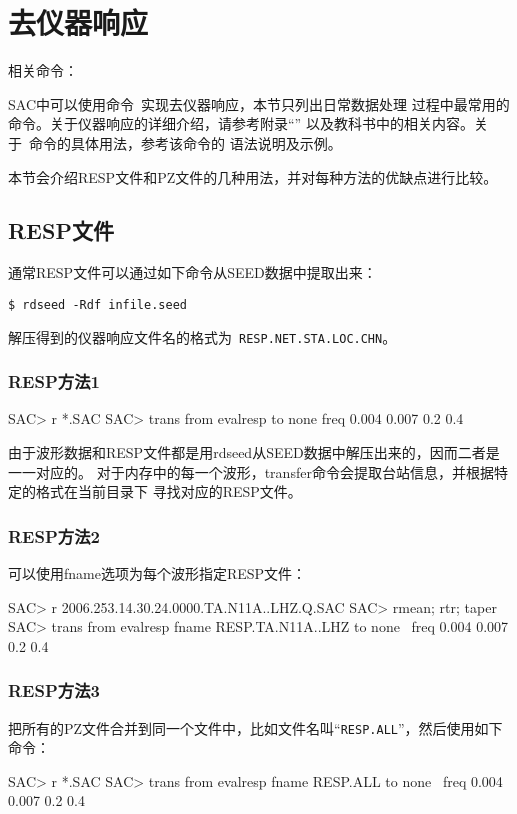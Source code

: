 \section{去仪器响应}
\label{sec:instrument-response}
相关命令：

SAC中可以使用命令~实现去仪器响应，本节只列出日常数据处理
过程中最常用的命令。关于仪器响应的详细介绍，请参考附录``''
以及教科书中的相关内容。关于~命令的具体用法，参考该命令的
语法说明及示例。

本节会介绍RESP文件和PZ文件的几种用法，并对每种方法的优缺点进行比较。
\subsection{RESP文件}
通常RESP文件可以通过如下命令从SEED数据中提取出来：
\begin{verbatim}
$ rdseed -Rdf infile.seed
\end{verbatim}
解压得到的仪器响应文件名的格式为~\verb+RESP.NET.STA.LOC.CHN+。

\subsubsection{RESP方法1}
\begin{SACCode}
SAC> r *.SAC
SAC> trans from evalresp to none freq 0.004 0.007 0.2 0.4
\end{SACCode}
由于波形数据和RESP文件都是用rdseed从SEED数据中解压出来的，因而二者是一一对应的。
对于内存中的每一个波形，transfer命令会提取台站信息，并根据特定的格式在当前目录下
寻找对应的RESP文件。

\subsubsection{RESP方法2}
可以使用fname选项为每个波形指定RESP文件：
\begin{SACCode}
SAC> r 2006.253.14.30.24.0000.TA.N11A..LHZ.Q.SAC
SAC> rmean; rtr; taper
SAC> trans from evalresp fname RESP.TA.N11A..LHZ to none \
                                freq 0.004 0.007 0.2 0.4
\end{SACCode}

\subsubsection{RESP方法3}
把所有的PZ文件合并到同一个文件中，比如文件名叫``\verb+RESP.ALL+''，然后使用如下命令：
\begin{SACCode}
SAC> r *.SAC
SAC> trans from evalresp fname RESP.ALL to none \
                            freq 0.004 0.007 0.2 0.4
\end{SACCode}

